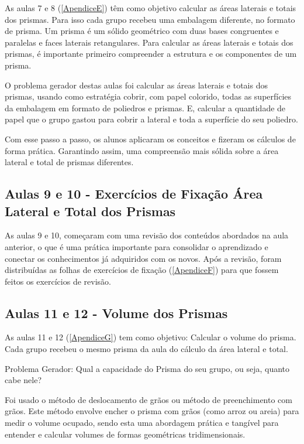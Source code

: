 As aulas 7 e 8 (\autoref{ApendiceE}) têm como objetivo calcular as áreas laterais e totais dos prismas. Para isso cada grupo recebeu uma embalagem diferente, no formato de prisma. Um prisma é um sólido geométrico com duas bases congruentes e paralelas e faces laterais retangulares. Para calcular as áreas laterais e totais dos prismas, é importante primeiro compreender a estrutura e os componentes de um prisma.

O problema gerador destas aulas foi calcular as áreas laterais e totais dos prismas, usando como estratégia cobrir, com papel colorido, todas as superfícies da embalagem em formato de poliedros e prismas. E, calcular a quantidade de papel que o grupo gastou para cobrir a lateral e toda a superfície do seu poliedro.

Com esse passo a passo, os alunos aplicaram os conceitos e fizeram os cálculos de forma prática. Garantindo assim, uma compreensão mais sólida sobre a área lateral e total de prismas diferentes.

\subsection{Aulas 9 e 10 - Exercícios de Fixação Área Lateral e Total dos Prismas}

As aulas 9 e 10, começaram com uma revisão dos conteúdos abordados na aula anterior, o que é uma prática importante para consolidar o aprendizado e conectar os conhecimentos já adquiridos com os novos. Após a revisão, foram distribuídas as folhas de exercícios de fixação (\autoref{ApendiceF}) para que fossem feitos os exercícios de revisão.

\subsection{Aulas 11 e 12 - Volume dos Prismas}

As aulas 11 e 12 (\autoref{ApendiceG}) tem como objetivo: Calcular o volume do prisma. Cada grupo recebeu o mesmo prisma da aula do cálculo da área lateral e total.

Problema Gerador: Qual a capacidade do Prisma do seu grupo, ou seja, quanto cabe nele?

Foi usado o método de deslocamento de grãos ou método de preenchimento com grãos. Este método envolve encher o prisma com grãos (como arroz ou areia) para medir o volume ocupado, sendo esta uma abordagem prática e tangível para entender e calcular volumes de formas geométricas tridimensionais.

